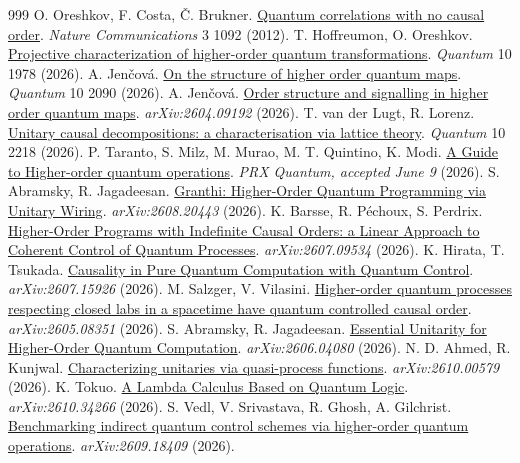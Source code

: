\begin{thebibliography}{999}
 O. Oreshkov, F. Costa, Č. Brukner. \href{https://doi.org/10.1038/ncomms2076}{Quantum correlations with no causal order}. \emph{Nature Communications} 3 1092 (2012).
 T. Hoffreumon, O. Oreshkov. \href{https://doi.org/10.22331/q-2026-01-21-1978}{Projective characterization of higher-order quantum transformations}. \emph{Quantum} 10 1978 (2026).
 A. Jenčová. \href{https://doi.org/10.22331/q-2026-05-05-2090}{On the structure of higher order quantum maps}. \emph{Quantum} 10 2090 (2026).
 A. Jenčová. \href{https://arxiv.org/abs/2604.09192}{Order structure and signalling in higher order quantum maps}. \emph{arXiv:2604.09192}  (2026).
 T. van der Lugt, R. Lorenz. \href{https://doi.org/10.22331/q-2026-09-30-2218}{Unitary causal decompositions: a characterisation via lattice theory}. \emph{Quantum} 10 2218 (2026).
 P. Taranto, S. Milz, M. Murao, M. T. Quintino, K. Modi. \href{https://doi.org/10.1103/92c4-g7qs}{A Guide to Higher-order quantum operations}. \emph{PRX Quantum, accepted June 9}  (2026).
 S. Abramsky, R. Jagadeesan. \href{https://arxiv.org/abs/2608.20443}{Granthi: Higher-Order Quantum Programming via Unitary Wiring}. \emph{arXiv:2608.20443}  (2026).
 K. Barsse, R. Péchoux, S. Perdrix. \href{https://arxiv.org/abs/2607.09534}{Higher-Order Programs with Indefinite Causal Orders: a Linear Approach to Coherent Control of Quantum Processes}. \emph{arXiv:2607.09534}  (2026).
 K. Hirata, T. Tsukada. \href{https://arxiv.org/abs/2607.15926}{Causality in Pure Quantum Computation with Quantum Control}. \emph{arXiv:2607.15926}  (2026).
 M. Salzger, V. Vilasini. \href{https://arxiv.org/abs/2605.08351}{Higher-order quantum processes respecting closed labs in a spacetime have quantum controlled causal order}. \emph{arXiv:2605.08351}  (2026).
 S. Abramsky, R. Jagadeesan. \href{https://arxiv.org/abs/2606.04080}{Essential Unitarity for Higher-Order Quantum Computation}. \emph{arXiv:2606.04080}  (2026).
 N. D. Ahmed, R. Kunjwal. \href{https://arxiv.org/abs/2610.00579}{Characterizing unitaries via quasi-process functions}. \emph{arXiv:2610.00579}  (2026).
 K. Tokuo. \href{https://arxiv.org/abs/2610.34266}{A Lambda Calculus Based on Quantum Logic}. \emph{arXiv:2610.34266}  (2026).
 S. Vedl, V. Srivastava, R. Ghosh, A. Gilchrist. \href{https://arxiv.org/abs/2609.18409}{Benchmarking indirect quantum control schemes via higher-order quantum operations}. \emph{arXiv:2609.18409}  (2026).

\end{thebibliography}
